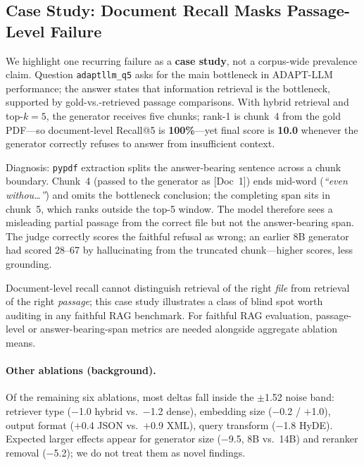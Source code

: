 \documentclass[11pt]{article}
\begin{document}
\subsection{Case Study: Document Recall Masks Passage-Level Failure}
\label{sec:recall}

We highlight one recurring failure as a \textbf{case study}, not a corpus-wide prevalence claim.
Question \texttt{adaptllm\_q5} asks for the main bottleneck in ADAPT-LLM performance; the answer states that information retrieval is the bottleneck, supported by gold-vs.-retrieved passage comparisons.
With hybrid retrieval and top-$k{=}5$, the generator receives five chunks; rank-1 is chunk~4 from the gold PDF---so document-level Recall@5 is \textbf{100\%}---yet final score is \textbf{10.0} whenever the generator correctly refuses to answer from insufficient context.

Diagnosis: \texttt{pypdf} extraction splits the answer-bearing sentence across a chunk boundary.
Chunk~4 (passed to the generator as [Doc~1]) ends mid-word (\emph{``even withou\ldots''}) and omits the bottleneck conclusion; the completing span sits in chunk~5, which ranks outside the top-5 window.
The model therefore sees a misleading partial passage from the correct file but not the answer-bearing span.
The judge correctly scores the faithful refusal as wrong; an earlier 8B generator had scored 28--67 by hallucinating from the truncated chunk---higher scores, less grounding.

Document-level recall cannot distinguish retrieval of the right \emph{file} from retrieval of the right \emph{passage}; this case study illustrates a class of blind spot worth auditing in any faithful RAG benchmark.
For faithful RAG evaluation, passage-level or answer-bearing-span metrics are needed alongside aggregate ablation means.

\paragraph{Other ablations (background).}
Of the remaining six ablations, most deltas fall inside the $\pm$1.52 noise band: retriever type ($-$1.0 hybrid vs.\ $-$1.2 dense), embedding size ($-$0.2 / $+$1.0), output format ($+$0.4 JSON vs.\ $+$0.9 XML), query transform ($-$1.8 HyDE).
Expected larger effects appear for generator size ($-$9.5, 8B vs.\ 14B) and reranker removal ($-$5.2); we do not treat them as novel findings.
\end{document}
